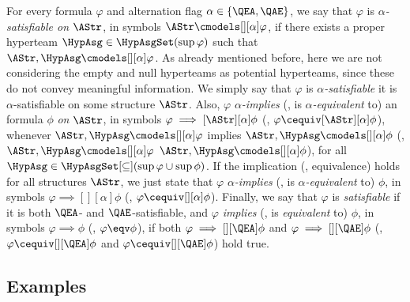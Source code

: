\documentclass[authoryear]{elsarticle}
\begin{document}
For every \ADIF formula $\varphi$ and alternation flag $\alpha \in \{ \QEA, \QAE
\}$, we say that $\varphi$ is \emph{$\alpha$-satisfiable on $\AStr$}, in symbols
$\AStr \cmodels[][\alpha] \varphi$, if there exists a proper hyperteam $\HypAsg
\in \HypAsgSet(\sup{\varphi})$ such that $\AStr, \HypAsg \cmodels[][\alpha]
\varphi$.
As already mentioned before, here we are not considering the empty and null
hyperteams as potential hyperteams, since these do not convey meaningful information.
We simply say that $\varphi$ is \emph{$\alpha$-satisfiable} \iff it is
$\alpha$-satisfiable on some structure $\AStr$.
Also, $\varphi$ \emph{$\alpha$-implies} (\resp, is \emph{$\alpha$-equivalent}
to) an \ADIF formula $\phi$ \emph{on $\AStr$}, in symbols $\varphi
\implies[\AStr][\alpha] \phi$ (\resp, $\varphi \cequiv[\AStr][\alpha] \phi$),
whenever $\AStr, \HypAsg \cmodels[][\alpha] \varphi$ implies $\AStr, \HypAsg
\cmodels[][\alpha] \phi$ (\resp, $\AStr, \HypAsg \cmodels[][\alpha] \varphi$
\iff $\AStr, \HypAsg \cmodels[][\alpha] \phi$), for all $\HypAsg \in
\HypAsgSet[\subseteq](\sup{\varphi} \cup \sup{\phi})$.
%
If the implication (\resp, equivalence) holds for all structures $\AStr$, we
just state that $\varphi$ \emph{$\alpha$-implies} (\resp, is
\emph{$\alpha$-equivalent} to) $\phi$, in symbols $\varphi \implies[][\alpha]
\phi$ (\resp, $\varphi \cequiv[][\alpha] \phi$).
Finally, we say that $\varphi$ is \emph{satisfiable} if it is both $\QEA$- and
$\QAE$-satisfiable, and $\varphi$ \emph{implies} (\resp, is \emph{equivalent}
to) $\phi$, in symbols $\varphi \implies \phi$ (\resp, $\varphi \eqv \phi$), if
both $\varphi \implies[][\QEA] \phi$ and $\varphi \implies[][\QAE] \phi$ (\resp,
$\varphi \cequiv[][\QEA] \phi$ and $\varphi \cequiv[][\QAE] \phi$) hold true.






\subsection{Examples}
\label{sec:adif;sub:exm}
\end{document}
